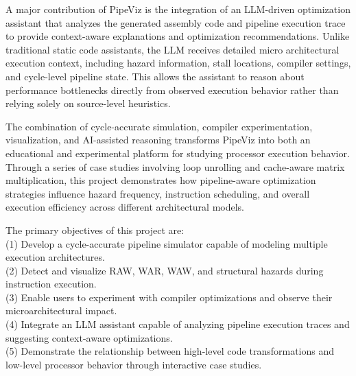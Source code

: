 A major contribution of PipeViz is the integration of an LLM-driven optimization assistant that analyzes the generated assembly code and pipeline execution trace to provide context-aware explanations and optimization recommendations. Unlike traditional static code assistants, the LLM receives detailed micro architectural execution context, including hazard information, stall locations, compiler settings, and cycle-level pipeline state. This allows the assistant to reason about performance bottlenecks directly from observed execution behavior rather than relying solely on source-level heuristics.

The combination of cycle-accurate simulation, compiler experimentation, visualization, and AI-assisted reasoning transforms PipeViz into both an educational and experimental platform for studying processor execution behavior. Through a series of case studies involving loop unrolling and cache-aware matrix multiplication, this project demonstrates how pipeline-aware optimization strategies influence hazard frequency, instruction scheduling, and overall execution efficiency across different architectural models.

The primary objectives of this project are: \\
(1) Develop a cycle-accurate pipeline simulator capable of modeling multiple execution architectures. \\
(2) Detect and visualize RAW, WAR, WAW, and structural hazards during instruction execution. \\
(3) Enable users to experiment with compiler optimizations and observe their microarchitectural impact. \\
(4) Integrate an LLM assistant capable of analyzing pipeline execution traces and suggesting context-aware optimizations. \\
(5) Demonstrate the relationship between high-level code transformations and low-level processor behavior through interactive case studies. \\
